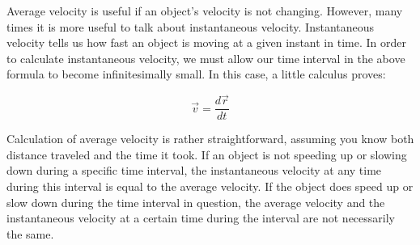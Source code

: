 Average velocity is useful if an object's velocity is not changing.  However, many times it is more useful to talk about instantaneous velocity.  Instantaneous velocity tells us how fast an object is moving at a given instant in time.  In order to calculate instantaneous velocity, we must allow our time interval in the above formula to become infinitesimally small.  In this case, a little calculus proves:
\begin{mdframed}[backgroundcolor=orange!20!white]
	\begin{equation}
	\vec{v} = \frac{d\vec{r}}{dt}
	\label{equation:instantaneousvelocity}
	\end{equation}
\end{mdframed}	
	
	Calculation of average velocity is rather straightforward, assuming you know both distance traveled and the time it took.  If an object is not speeding up or slowing down during a specific time interval, the instantaneous velocity at any time during this interval is equal to the average velocity.  If the object does speed up or slow down during the time interval in question, the average velocity and the instantaneous velocity at a certain time during the interval are not necessarily the same. 
	
